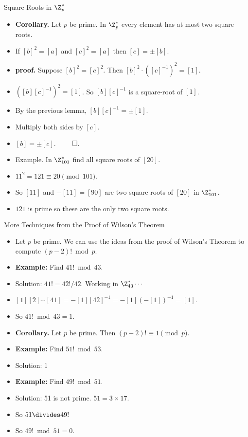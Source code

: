 \documentclass[handout]{beamer}
\begin{document}
\begin{frame}{Square Roots in $\Z_p^*$}
\begin{itemize}
  \item \textbf{Corollary.} Let $p$ be prime. In $\Z_p^*$ every element has at most two square roots.
  \item If $[b]^2 = [a]$ and $[c]^2 = [a]$ then $[c]=\pm [b]$.
  \item \textbf{proof.} Suppose $[b]^2=[c]^2$. Then $[b]^2 \cdot ([c]^{-1})^2 = [1]$.
  \item $([b][c]^{-1})^2 = [1]$. So $[b][c]^{-1}$ is a square-root of $[1]$.
  \item By the previous lemma, $[b][c]^{-1}=\pm[1]$.
  \item Multiply both sides by $[c]$.
  \item $[b]=\pm[c]$. $\qed$.
  \item Example. In $\Z_{101}^*$ find all square roots of $[20]$.
  \item $11^2=121\equiv 20 \pmod{101}$.
  \item So $[11]$ and $-[11]=[90]$ are two square roots of $[20]$ in $\Z_{101}^*$.
  \item $121$ is prime so these are the only two square roots.
\end{itemize}
\end{frame}

\begin{frame}{More Techniques from the Proof of Wilson's Theorem}
\begin{itemize}
  \item Let $p$ be prime. We can use the ideas from the proof of Wilson's Theorem to compute $(p-2)! \bmod p$.
  \item \textbf{Example:} Find $41! \bmod 43$.
  \item Solution: $41! = 42!/42$. Working in $\Z_{43}^* \cdots$
  \item $[1][2]\cdots[41] = -[1][42]^{-1}=-[1](-[1])^{-1} = [1]$.
  \item So $41! \bmod 43 = 1$.
  \item \textbf{Corollary.} Let $p$ be prime. Then $(p-2)! \equiv 1 \pmod{p}$.
  \item \textbf{Example:} Find $51!  \bmod 53$.
  \item Solution: 1
  \item \textbf{Example:} Find $49!  \bmod 51$.
  \item Solution: 51 is not prime. $51=3\times 17$.
  \item So $51 \divides 49!$
  \item So $49! \bmod 51 = 0$.
\end{itemize}
\end{frame}
\end{document}
